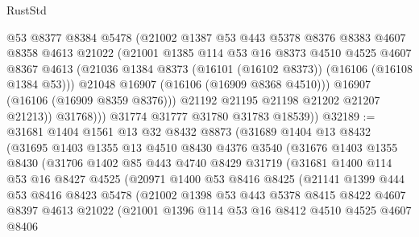 \begin{lexlean}{RustStd}
\begin{coremodule}
                  @53
                  @8377
                  @8384
                  @5478
                  (@21002
                    @1387
                    @53
                    @443
                    @5378
                    @8376
                    @8383
                    @4607
                    @8358
                    @4613
                    @21022
                    (@21001
                      @1385
                      @114
                      @53
                      @16
                      @8373
                      @4510
                      @4525
                      @4607
                      @8367
                      @4613
                      (@21036 @1384 @8373 (@16101 (@16102 @8373)) (@16106 (@16108 @1384 @53)))
                      @21048
                      @16907
                      (@16106 (@16909 @8368 @4510)))
                    @16907
                    (@16106 (@16909 @8359 @8376)))
                  @21192
                  @21195
                  @21198
                  @21202
                  @21207
                  @21213))
              @31768)))
        @31774
        @31777
        @31780
        @31783
        @18539))
@32189 := @31681
    @1404
    @1561
    @13
    @32
    @8432
    @8873
    (@31689
      @1404
      @13
      @8432
      (@31695
        @1403
        @1355
        @13
        @4510
        @8430
        @4376
        @3540
        (@31676
          @1403
          @1355
          @8430
          (@31706
            @1402
            @85
            @443
            @4740
            @8429
            @31719
            (@31681
              @1400
              @114
              @53
              @16
              @8427
              @4525
              (@20971
                @1400
                @53
                @8416
                @8425
                (@21141
                  @1399
                  @444
                  @53
                  @8416
                  @8423
                  @5478
                  (@21002
                    @1398
                    @53
                    @443
                    @5378
                    @8415
                    @8422
                    @4607
                    @8397
                    @4613
                    @21022
                    (@21001
                      @1396
                      @114
                      @53
                      @16
                      @8412
                      @4510
                      @4525
                      @4607
                      @8406

\end{coremodule}
\end{lexlean}
